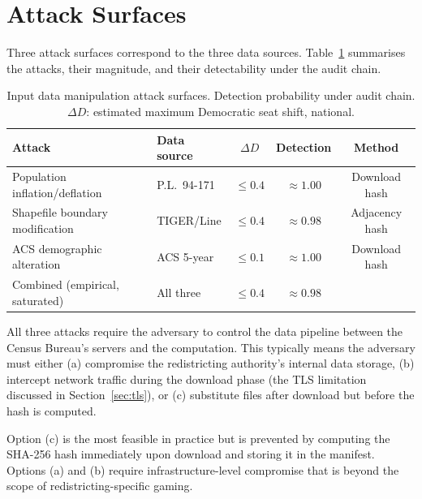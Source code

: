 \section{Attack Surfaces}
\label{sec:attack}

Three attack surfaces correspond to the three data sources.
Table~\ref{tab:attacks} summarises the attacks, their magnitude, and
their detectability under the \bisect{} audit chain.

\begin{table}[h]
\centering
\caption{Input data manipulation attack surfaces.
         Detection probability under \bisect{} audit chain.
         $\Delta D$: estimated maximum Democratic seat shift, national.}
\label{tab:attacks}
\begin{tabular}{llccc}
\toprule
Attack & Data source & $\Delta D$ & Detection & Method \\
\midrule
Population inflation/deflation & P.L.\ 94-171 & $\leq 0.4$ & $\approx 1.00$ & Download hash \\
Shapefile boundary modification & TIGER/Line & $\leq 0.4$ & $\approx 0.98$ & Adjacency hash \\
ACS demographic alteration & ACS 5-year & $\leq 0.1$ & $\approx 1.00$ & Download hash \\
\midrule
Combined (empirical, saturated) & All three & $\leq 0.4$ & $\approx 0.98$ & \\
\bottomrule
\end{tabular}
\end{table}

All three attacks require the adversary to control the data pipeline
between the Census Bureau's servers and the \bisect{} computation.
This typically means the adversary must either (a) compromise the
redistricting authority's internal data storage, (b) intercept network
traffic during the download phase (the TLS limitation discussed in
Section~\ref{sec:tls}), or (c) substitute files after download but
before the hash is computed.

Option (c) is the most feasible in practice but is prevented by computing
the SHA-256 hash immediately upon download and storing it in the manifest.
Options (a) and (b) require infrastructure-level compromise that is
beyond the scope of redistricting-specific gaming.
